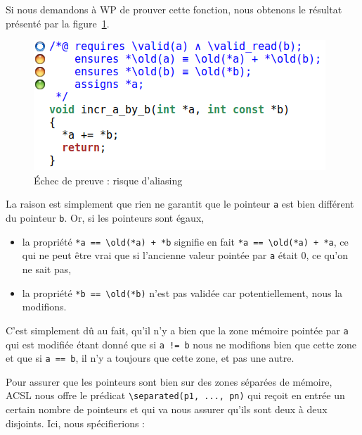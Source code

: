 \documentclass[12pt,francais,]{scrbook}
\providecommand{\tightlist}{%
  \setlength{\itemsep}{0pt}\setlength{\parskip}{0pt}}
\newenvironment{zdsexampleblock}[1]{%
  \tcolorbox[beamer,%
    noparskip,breakable,
    colback=LightGreen,colframe=DarkGreen,%
    colbacklower=LimeGreen,%
    title=#1]
}{\endtcolorbox}
\begin{document}
Si nous demandons à WP de prouver cette fonction, nous obtenons le
résultat présenté par la figure~\ref{fig:2-2-2-incr_a_by_b-1}.

\begin{figure}[htbp]
\centering
\includegraphics[scale=0.5]{2-2-2-incr_a_by_b-1.png}
\caption{Échec de preuve : risque d'aliasing}
\label{fig:2-2-2-incr_a_by_b-1}
\end{figure}

La raison est simplement que rien ne garantit que le pointeur \texttt{a}
est bien différent du pointeur \texttt{b}. Or, si les pointeurs sont
égaux,

\begin{itemize}
\tightlist
\item
  la propriété \texttt{*a\ ==\ \textbackslash{}old(*a)\ +\ *b} signifie
  en fait \texttt{*a\ ==\ \textbackslash{}old(*a)\ +\ *a}, ce qui ne
  peut être vrai que si l'ancienne valeur pointée par \texttt{a} était
  0, ce qu'on ne sait pas,
\item
  la propriété \texttt{*b\ ==\ \textbackslash{}old(*b)} n'est pas
  validée car potentiellement, nous la modifions.
\end{itemize}

\begin{zdsexampleblock}{Pourquoi la clause assign est-elle validée ?}
  C'est simplement dû au fait, qu'il n'y a
  bien que la zone mémoire pointée par \texttt{a} qui est
  modifiée étant donné que si \texttt{a\ !=\ b} nous ne modifions bien
  que cette zone et que si \texttt{a\ ==\ b}, il n'y a toujours
  que cette zone, et pas une autre.
\end{zdsexampleblock}

Pour assurer que les pointeurs sont bien sur des zones séparées de
mémoire, ACSL nous offre le prédicat
\texttt{\textbackslash{}separated(p1,\ ...,\ pn)} qui reçoit en entrée
un certain nombre de pointeurs et qui va nous assurer qu'ils sont deux à
deux disjoints. Ici, nous spécifierions :
\end{document}
